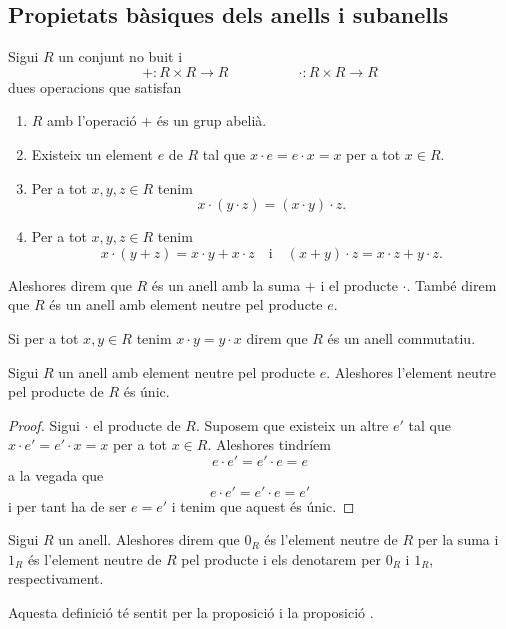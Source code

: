 \documentclass[../../Main.tex]{subfiles}
\begin{document}
	\subsection{Propietats bàsiques dels anells i subanells}
	\begin{definition}[Anell]
		\label{def:anell}
		\label{def:anell commutatiu}
		\label{def:anell i element neutre pel producte}
		Sigui \(R\) un conjunt no buit i
		\[+\colon R\times R\longrightarrow R\qquad\qquad\quad\cdot\colon R\times R\longrightarrow R\]
		dues operacions que satisfan
		\begin{enumerate}
			\item \(R\) amb l'operació \(+\) és un grup abelià.
			\item Existeix un element \(e\) de \(R\) tal que \(x\cdot e=e\cdot x=x\) per a tot \(x\in R\).
			\item Per a tot \(x,y,z\in R\) tenim
			\[x\cdot(y\cdot z)=(x\cdot y)\cdot z.\]
			\item Per a tot \(x,y,z\in R\) tenim
			\[x\cdot(y+z)=x\cdot y+x\cdot z\quad\text{i}\quad(x+y)\cdot z=x\cdot z+y\cdot z.\]
		\end{enumerate}
		Aleshores direm que \(R\) és un anell amb la suma \(+\) i el producte \(\cdot\). També direm que \(R\) és un anell amb element neutre pel producte \(e\).
		
		Si per a tot \(x,y\in R\) tenim \(x\cdot y=y\cdot x\) direm que \(R\) és un anell commutatiu.
	\end{definition}
	\begin{proposition}
		\label{prop:unicitat neutre del producte anell}
		Sigui \(R\) un anell amb element neutre pel producte \(e\). Aleshores l'element neutre pel producte de \(R\) és únic.
		\begin{proof}
			Sigui \(\cdot\) el producte de \(R\). Suposem que existeix un altre \(e'\) tal que \(x\cdot e'=e'\cdot x=x\) per a tot \(x\in R\). Aleshores tindríem
			\[e\cdot e'=e'\cdot e=e\]
			a la vegada que
			\[e\cdot e'=e'\cdot e=e'\]
			i per tant ha de ser \(e=e'\) i tenim que aquest és únic.
		\end{proof}
	\end{proposition}
	\begin{definition}
		\label{def:l'element neutre d'un anell per la suma}
		\label{def:l'element neutre d'un anell pel producte}
		Sigui \(R\) un anell. Aleshores direm que \(0_{R}\) és l'element neutre de \(R\) per la suma i \(1_{R}\) és l'element neutre de \(R\) pel producte i els denotarem per \(0_{R}\) i \(1_{R}\), respectivament.
		
		Aquesta definició té sentit per la proposició  i la proposició .
	\end{definition}
\end{document}
